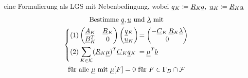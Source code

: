 eine Formulierung als LGS mit Nebenbedingung, wobei $ \ubar{q}_K \coloneqq \ubar{R}_K \ubar{q}, \ \ubar{u}_K \coloneqq \ubar{R}_K \ubar{u} $
\begin{gather*}
	\text{Bestimme } \underline{q}{}, \underline{u}{} \text{ und } \underline{\lambda}{} \text{ mit}\\
	\begin{dcases}
		(1) \begin{pmatrix}
			\underline{A}{}_K & \underline{B}{}_K \\
			\underline{B}{}_K^T & 0
		\end{pmatrix}
		\begin{pmatrix}
			\underline{q}{}_K\\
			\underline{u}{}_K
		\end{pmatrix}
		\mkern-16mu&= \begin{pmatrix}
			- \underline{C}{}_K \, \underline{R}{}_K \underline{\lambda}{} \\
			0
		\end{pmatrix}\\
		(2) \sum_{K \in \mathcal{K}}  (\underline{R}{}_K \underline{\mu}{})^T \underline{C}{}_K \underline{q}{}_K \mkern-16mu&= \underline{\mu}{}^T \underline{b}{}		
	\end{dcases}\\
	\text{für alle } \underline{\mu}{} \text{ mit } \underline{\mu}{}[F] = 0 \text{ für } F \in \Gamma_D \cap \mathcal{F}
\end{gather*}

